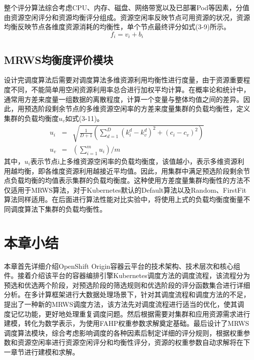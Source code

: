 整个评分算法综合考虑CPU、内存、磁盘、网络带宽以及已部署Pod等因素，分值由资源空闲评分和资源均衡评分组成。资源空闲率反映节点可用资源的状况，资源均衡反映节点各维度资源消耗的均衡性，单个节点最终评分如式(3-9)所示。
\begin{equation}
f_{i} = v_{i}+b_{i}
\end{equation}

\subsection{MRWS均衡度评价模块}
设计完调度算法后需要对调度算法多维资源利用均衡性进行度量，由于资源重要程度不同，不能简单用空闲资源利用率总合进行加权平均计算。在概率论和统计中，通常用方差来度量一组数据的离散程度，计算一个变量与整体均值之间的差异。因此，用预选阶段剩余节点的多维资源空闲率的方差来度量集群的负载均衡性，定义集群的负载均衡度$u_{v}$如式(3-11)。
\begin{eqnarray}
	u_{i} &=& \sqrt{\frac{1}{D+1}(\sum_{d=1}^{D}(k_{i}^{d}-k_{v}^{d})^{2}+(c_{i}-c_{v})^{2})} \\[0.3cm]
	u_{v} &=& (\sum_{i=1}^{m}u_{i})/m
\end{eqnarray}
其中，\begin{math}u_{i}\end{math}表示节点i上多维资源空闲率的负载均衡度，该值越小，表示多维资源利用越均衡，即各维度资源利用越接近平均值。因此，用集群中满足预选阶段剩余节点负载均衡的均值表示集群的负载均衡度。这种使用方差度量集群均衡性的方法不仅适用于MRWS算法，对于Kubernetes默认的Default算法以及Random、FirstFit算法同样适用。在后面进行算法性能对比实验中，将使用上式的负载均衡度衡量不同调度算法下集群的负载均衡性。

\section{本章小结}
本章首先详细介绍OpenShift Origin容器云平台的技术架构、技术层次和核心组件。接着介绍该平台的容器编排引擎Kubernetes调度方法的调度流程，该流程分为预选和优选两个阶段，对预选阶段的筛选规则和优选阶段的评分函数集合进行详细分析。在多计算框架进行大数据处理场景下，针对其调度流程和调度方法的不足，提出了一种新的MRWS调度方法，该方法先对调度流程进行适当的优化，使其调度记忆功能，更好地处理重复调度问题。然后根据需要对集群和应用资源需求进行建模，转化为数学表示，为使用FAHP权重参数求解奠定基础。最后设计了MRWS调度算法模块，综合考虑影响调度的各种因素后制定详细的评分规则，根据权重参数和资源空闲率进行资源空闲评分和均衡性评分，资源的权重参数自动求解将在下一章节进行建模和求解。




